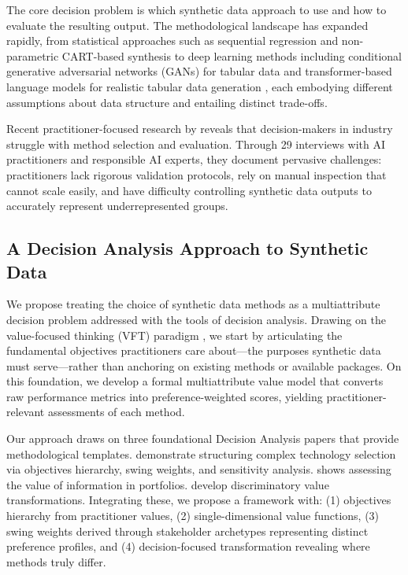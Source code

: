 \documentclass[12pt,a4paper]{article}
\begin{document}
The core decision problem is which synthetic data approach to use and how to evaluate the resulting output. The methodological landscape has expanded rapidly, from statistical approaches such as sequential regression and non-parametric CART-based synthesis \citep{nowok2016synthpop} to deep learning methods including conditional generative adversarial networks (GANs) for tabular data \citep{xu2019modeling} and transformer-based language models for realistic tabular data generation \citep{borisov2023language}, each embodying different assumptions about data structure and entailing distinct trade-offs.

Recent practitioner-focused research by \citet{kapania2025examining} reveals that decision-makers in industry struggle with method selection and evaluation. Through 29 interviews with AI practitioners and responsible AI experts, they document pervasive challenges: practitioners lack rigorous validation protocols, rely on manual inspection that cannot scale easily, and have difficulty controlling synthetic data outputs to accurately represent underrepresented groups.

\subsection{A Decision Analysis Approach to Synthetic Data}

We propose treating the choice of synthetic data methods as a multiattribute decision problem addressed with the tools of decision analysis. Drawing on the value-focused thinking (VFT) paradigm \citep{keeney1992value}, we start by articulating the fundamental objectives practitioners care about---the purposes synthetic data must serve---rather than anchoring on existing methods or available packages. On this foundation, we develop a formal multiattribute value model that converts raw performance metrics into preference-weighted scores, yielding practitioner-relevant assessments of each method.

Our approach draws on three foundational Decision Analysis papers that provide methodological templates. \citet{butler2005plutonium} demonstrate structuring complex technology selection via objectives hierarchy, swing weights, and sensitivity analysis. \citet{keisler2004value} shows assessing the value of information in portfolios. \citet{dees2010decision} develop discriminatory value transformations. Integrating these, we propose a framework with: (1) objectives hierarchy from practitioner values, (2) single-dimensional value functions, (3) swing weights derived through stakeholder archetypes representing distinct preference profiles, and (4) decision-focused transformation revealing where methods truly differ.
\end{document}
